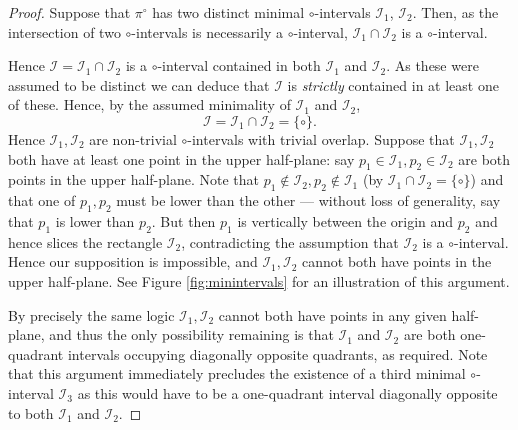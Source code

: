 \documentclass[11pt,a4paper]{article}
\theoremstyle{definition}
\begin{document}
\begin{proof}
Suppose that $\pi^{\circ}$ has two distinct minimal $\circ$-intervals $\mathcal{I}_{1}$, $\mathcal{I}_{2}$. Then, as the intersection of two $\circ$-intervals is necessarily a $\circ$-interval, $\mathcal{I}_{1} \cap \mathcal{I}_{2}$ is a $\circ$-interval.

Hence $\mathcal{I} = \mathcal{I}_{1} \cap \mathcal{I}_{2}$ is a $\circ$-interval contained in both $\mathcal{I}_{1}$ and $\mathcal{I}_{2}$. As these were assumed to be distinct we can deduce that $\mathcal{I}$ is \emph{strictly} contained in at least one of these. Hence, by the assumed minimality of $\mathcal{I}_{1}$ and $\mathcal{I}_{2}$,
\[
\mathcal{I} = \mathcal{I}_{1} \cap \mathcal{I}_{2} = \{\circ\}.
\]
Hence $\mathcal{I}_{1}, \mathcal{I}_{2}$ are non-trivial $\circ$-intervals with trivial overlap. Suppose that $\mathcal{I}_{1}, \mathcal{I}_{2}$ both have at least one point in the upper half-plane: say $p_{1} \in \mathcal{I}_{1},p_{2} \in \mathcal{I}_{2}$ are both points in the upper half-plane. Note that $p_{1} \notin \mathcal{I}_{2},p_{2} \notin \mathcal{I}_{1}$ (by $\mathcal{I}_{1} \cap \mathcal{I}_{2} = \{\circ\}$) and that one of $p_{1},p_{2}$ must be lower than the other --- without loss of generality, say that $p_{1}$ is lower than $p_{2}$. But then $p_{1}$ is vertically between the origin and $p_{2}$ and hence slices the rectangle $\mathcal{I}_{2}$, contradicting the assumption that $\mathcal{I}_{2}$ is a $\circ$-interval. Hence our supposition is impossible, and $\mathcal{I}_{1}, \mathcal{I}_{2}$ cannot both have points in the upper half-plane. See Figure \ref{fig:minintervals} for an illustration of this argument.

By precisely the same logic $\mathcal{I}_{1}, \mathcal{I}_{2}$ cannot both have points in any given half-plane, and thus the only possibility remaining is that $\mathcal{I}_{1}$ and $\mathcal{I}_{2}$ are both one-quadrant intervals occupying diagonally opposite quadrants, as required. Note that this argument immediately precludes the existence of a third minimal $\circ$-interval $\mathcal{I}_{3}$ as this would have to be a one-quadrant interval diagonally opposite to both $\mathcal{I}_{1}$ and $\mathcal{I}_{2}$. \qedhere
\end{proof}
\end{document}

